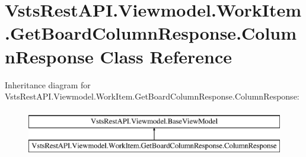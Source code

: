 \hypertarget{class_vsts_rest_a_p_i_1_1_viewmodel_1_1_work_item_1_1_get_board_column_response_1_1_column_response}{}\section{Vsts\+Rest\+A\+P\+I.\+Viewmodel.\+Work\+Item.\+Get\+Board\+Column\+Response.\+Column\+Response Class Reference}
\label{class_vsts_rest_a_p_i_1_1_viewmodel_1_1_work_item_1_1_get_board_column_response_1_1_column_response}
Inheritance diagram for Vsts\+Rest\+A\+P\+I.\+Viewmodel.\+Work\+Item.\+Get\+Board\+Column\+Response.\+Column\+Response\+:\begin{figure}[H]
\begin{center}
\leavevmode
\includegraphics[height=2.000000cm]{class_vsts_rest_a_p_i_1_1_viewmodel_1_1_work_item_1_1_get_board_column_response_1_1_column_response}
\end{center}
\end{figure}

